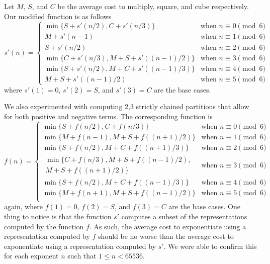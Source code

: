 \documentclass{ucalgthes1}
\theoremstyle{definition}
\begin{document}
Let $M$, $S$, and $C$ be the average cost to multiply, square, and cube respectively. Our modified function is as follows
\begin{equation*}
s'(n) = \begin{cases}
	\min\{S + s'(n/2), C + s'(n/3)\} & \textrm{when } n \equiv 0 \pmod 6 \\
	M + s'(n-1) & \textrm{when } n \equiv 1 \pmod 6 \\
	S + s'(n/2) & \textrm{when } n \equiv 2 \pmod 6 \\
	\min\{C + s'(n/3), M + S + s'((n-1)/2)\} & \textrm{when } n \equiv 3 \pmod 6 \\
	\min\{S + s'(n/2), M + C + s'((n-1)/3)\} & \textrm{when } n \equiv 4 \pmod 6 \\
	M + S + s'((n-1)/2) & \textrm{when } n \equiv 5 \pmod 6
\end{cases}
\end{equation*}
where $s'(1) = 0$, $s'(2) = S$, and $s'(3) = C$ are the base cases.

We also experimented with computing 2,3 strictly chained partitions that allow for both positive and negative terms.  The corresponding function is
\begin{equation*}
f(n) = \begin{cases}
	\min\{S + f(n/2), C + f(n/3)\} & \textrm{when } n \equiv 0 \pmod 6 \\
	\min\{M + f(n-1), M + S + f((n+1)/2)\} & \textrm{when } n \equiv 1 \pmod 6 \\
	\min\{S + f(n/2), M + C + f((n+1)/3)\} & \textrm{when } n \equiv 2 \pmod 6 \\
	\begin{split}\min\{C + f(n/3), M + S + f((n-1)/2),\\M + S + f((n+1)/2)\}\end{split} & \textrm{when } n \equiv 3 \pmod 6 \\
	\min\{S + f(n/2), M + C + f((n-1)/3)\} & \textrm{when } n \equiv 4 \pmod 6 \\
	\min\{M + f(n+1), M + S + f((n-1)/2)\} & \textrm{when } n \equiv 5 \pmod 6 \\
\end{cases}
\end{equation*}
again, where $f(1) = 0$, $f(2) = S$, and $f(3) = C$ are the base cases.  One thing to notice is that the function $s'$ computes a subset of the representations computed by the function $f$.  As such, the average cost to exponentiate using a representation computed by $f$ should be no worse than the average cost to exponentiate using a representation computed by $s'$.  We were able to confirm this for each exponent $n$ such that $1 \le n < 65536$.
\end{document}
